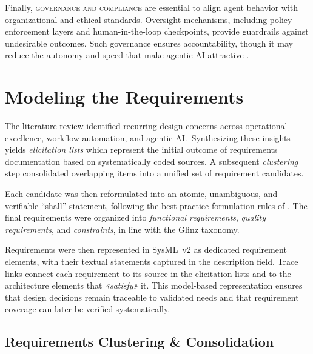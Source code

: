 Finally, \textsc{governance and compliance} are essential to align agent behavior with organizational and ethical standards. Oversight mechanisms, including policy enforcement layers and human-in-the-loop checkpoints, provide guardrails against undesirable outcomes. Such governance ensures accountability, though it may reduce the autonomy and speed that make agentic AI attractive \parencite{owoadeSystematic2024}.

\section{Modeling the Requirements}\label{sec:mod-req}
The literature review identified recurring design concerns across operational excellence, workflow automation, and agentic AI.~Synthesizing these insights yields \emph{elicitation lists} which represent the initial outcome of requirements documentation based on systematically coded sources. A subsequent \emph{clustering} step consolidated overlapping items into a unified set of requirement candidates.

Each candidate was then reformulated into an atomic, unambiguous, and verifiable “shall” statement, following the best-practice formulation rules of \textcite{glinzHandbook2020}. The final requirements were organized into \emph{functional requirements}, \emph{quality requirements}, and \emph{constraints}, in line with the Glinz taxonomy.

Requirements were then represented in SysML~v2 as dedicated requirement elements, with their textual statements captured in the description field. Trace links connect each requirement to its source in the elicitation lists and to the architecture elements that \emph{«satisfy»} it. This model-based representation ensures that design decisions remain traceable to validated needs and that requirement coverage can later be verified systematically. \\

\subsection{Requirements Clustering \& Consolidation}

